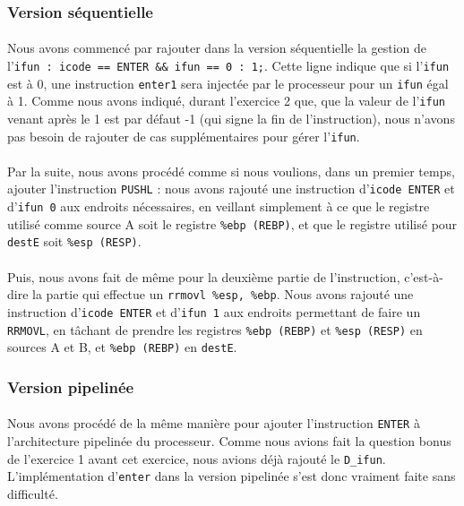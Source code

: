 \documentclass[12pt]{article}
\begin{document}
\subsubsection{Version séquentielle}
\paragraph{}Nous avons commencé par rajouter dans la version séquentielle la gestion de l'\verb+ifun : icode == ENTER && ifun == 0 : 1;+. Cette ligne indique que si l'\verb+ifun+ est à 0, une instruction \verb+enter1+ sera injectée par le processeur pour un \verb+ifun+ égal à 1. Comme nous avons indiqué, durant l'exercice 2 que, que la valeur de l'\verb+ifun+ venant après le 1 est par défaut -1 (qui signe la fin de l'instruction), nous n'avons pas besoin de rajouter de cas supplémentaires pour gérer l'\verb+ifun+.

\paragraph{}Par la suite, nous avons procédé comme si nous voulions, dans un premier temps, ajouter l'instruction \verb+PUSHL+ : nous avons rajouté une instruction d'\verb+icode ENTER+ et d'\verb+ifun 0+ aux endroits nécessaires, en veillant simplement à ce que le registre utilisé comme source A soit le registre \verb+%ebp (REBP)+, et que le registre utilisé pour \verb+destE+ soit \verb+%esp (RESP)+.

\paragraph{}Puis, nous avons fait de même pour la deuxième partie de l'instruction, c'est-à-dire la partie qui effectue un \verb+rrmovl %esp, %ebp+. Nous avons rajouté une instruction d'\verb+icode ENTER+ et d'\verb+ifun 1+ aux endroits permettant de faire un \verb+RRMOVL+, en tâchant de prendre les registres \verb+%ebp (REBP)+ et \verb+%esp (RESP)+ en sources A et B, et \verb+%ebp (REBP)+ en \verb+destE+.

\subsubsection{Version pipelinée}
\paragraph{}Nous avons procédé de la même manière pour ajouter l'instruction \verb+ENTER+ à l'architecture pipelinée du processeur. Comme nous avions fait la question bonus de l'exercice 1 avant cet exercice, nous avions déjà rajouté le \verb+D_ifun+. L'implémentation d'\verb+enter+ dans la version pipelinée s'est donc vraiment faite sans difficulté.
\end{document}
